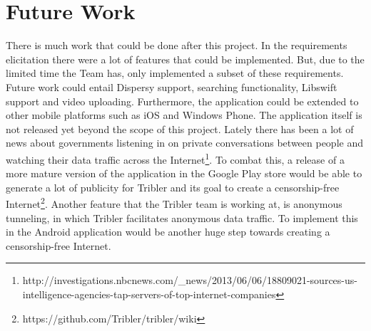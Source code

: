 \section{Future Work}
\thispagestyle{fancy}
There is much work that could be done after this project. In the requirements elicitation there were a lot of features that could be implemented. But, due to the limited time the Team has, only implemented a subset of these requirements. Future work could entail Dispersy support, searching functionality, Libswift support and video uploading. Furthermore, the application could be extended to other mobile platforms such as iOS and Windows Phone. The application itself is not released yet beyond the scope of this project. Lately there has been a lot of news about governments listening in on private conversations between people and watching their data traffic across the Internet\footnote{http://investigations.nbcnews.com/\_news/2013/06/06/18809021-sources-us-intelligence-agencies-tap-servers-of-top-internet-companies}. To combat this, a release of a more mature version of the application in the Google Play store would be able to generate a lot of publicity for Tribler and its goal to create a censorship-free Internet\footnote{https://github.com/Tribler/tribler/wiki}. Another feature that the Tribler team is working at, is anonymous tunneling, in which Tribler facilitates anonymous data traffic. To implement this in the Android application would be another huge step towards creating a censorship-free Internet.